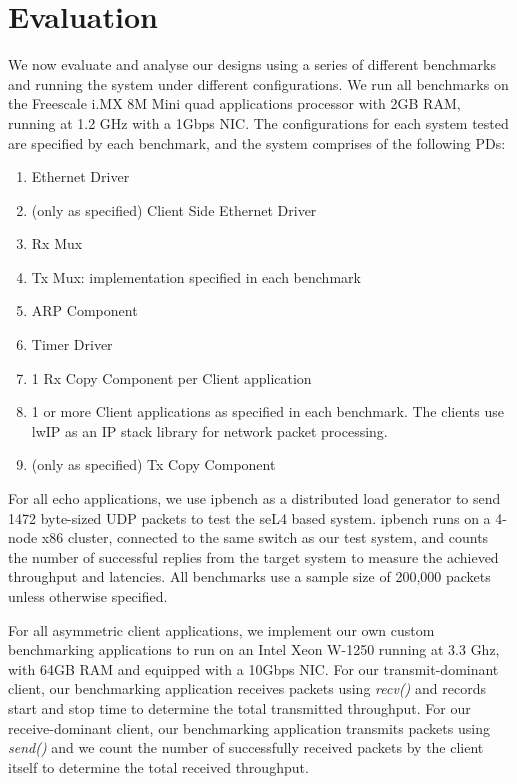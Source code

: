 \chapter{Evaluation}\label{ch:evaluation}

We now evaluate and analyse our designs using a series of different benchmarks and running
the system under different configurations. We run all benchmarks on the
Freescale i.MX 8M Mini quad applications processor with 2GB RAM, running at 1.2 GHz
with a 1Gbps NIC. The configurations for each system tested are specified by each benchmark,
and the system comprises of the following PDs:
\begin{enumerate}
    \item Ethernet Driver
    \item (only as specified) Client Side Ethernet Driver
    \item Rx Mux
    \item Tx Mux: implementation specified in each benchmark
    \item ARP Component
    \item Timer Driver
    \item 1 Rx Copy Component per Client application
    \item 1 or more Client applications as specified in each benchmark. 
        The clients use lwIP \cite{Dunkels_01} as an IP stack library for network packet processing. 
    \item (only as specified) Tx Copy Component
\end{enumerate}

For all echo applications, we use ipbench as a distributed load generator 
to send 1472 byte-sized UDP packets to test the seL4 based system. ipbench runs on a 4-node x86 cluster, 
connected to the same switch as our test system,
and counts the number of successful replies from the target system to measure the achieved throughput and latencies.
All benchmarks use a sample size of 200,000 packets unless otherwise specified. 

For all asymmetric client applications, we implement our own custom benchmarking applications to run on an Intel Xeon W-1250
running at 3.3 Ghz, with 64GB RAM and equipped with a 10Gbps NIC. For our transmit-dominant client, our benchmarking
application receives packets using \emph{recv()} and records start and stop time to determine the total transmitted
throughput. For our receive-dominant client, our benchmarking application transmits packets using \emph{send()} and
we count the number of successfully received packets by the client itself to determine the total received throughput.

